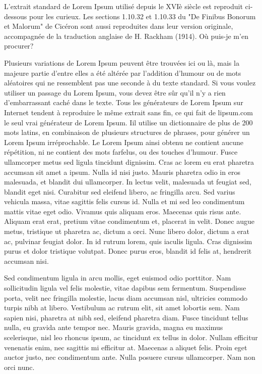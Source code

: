 L'extrait standard de Lorem Ipsum utilisé depuis le XVIè siècle est reproduit ci-dessous pour les curieux. Les sections 1.10.32 et 1.10.33 du "De Finibus Bonorum et Malorum" de Cicéron sont aussi reproduites dans leur version originale, accompagnée de la traduction anglaise de H. Rackham (1914).
Où puis-je m'en procurer?

Plusieurs variations de Lorem Ipsum peuvent être trouvées ici ou là, mais la majeure partie d'entre elles a été altérée par l'addition d'humour ou de mots aléatoires qui ne ressemblent pas une seconde à du texte standard. Si vous voulez utiliser un passage du Lorem Ipsum, vous devez être sûr qu'il n'y a rien d'embarrassant caché dans le texte. Tous les générateurs de Lorem Ipsum sur Internet tendent à reproduire le même extrait sans fin, ce qui fait de lipsum.com le seul vrai générateur de Lorem Ipsum. Iil utilise un dictionnaire de plus de 200 mots latins, en combinaison de plusieurs structures de phrases, pour générer un Lorem Ipsum irréprochable. Le Lorem Ipsum ainsi obtenu ne contient aucune répétition, ni ne contient des mots farfelus, ou des touches d'humour.
 Fusce ullamcorper metus sed ligula tincidunt dignissim. Cras ac lorem eu erat pharetra accumsan sit amet a ipsum. Nulla id nisi justo. Mauris pharetra odio in eros malesuada, et blandit dui ullamcorper. In lectus velit, malesuada ut feugiat sed, blandit eget nisi. Curabitur sed eleifend libero, ac fringilla arcu. Sed varius vehicula massa, vitae sagittis felis cursus id. Nulla et mi sed leo condimentum mattis vitae eget odio. Vivamus quis aliquam eros. Maecenas quis risus ante. Aliquam erat erat, pretium vitae condimentum et, placerat in velit. Donec augue metus, tristique ut pharetra ac, dictum a orci. Nunc libero dolor, dictum a erat ac, pulvinar feugiat dolor. In id rutrum lorem, quis iaculis ligula. Cras dignissim purus et dolor tristique volutpat. Donec purus eros, blandit id felis at, hendrerit accumsan nisi.

Sed condimentum ligula in arcu mollis, eget euismod odio porttitor. Nam sollicitudin ligula vel felis molestie, vitae dapibus sem fermentum. Suspendisse porta, velit nec fringilla molestie, lacus diam accumsan nisl, ultricies commodo turpis nibh at libero. Vestibulum ac rutrum elit, sit amet lobortis sem. Nam sapien nisi, pharetra at nibh sed, eleifend pharetra diam. Fusce tincidunt tellus nulla, eu gravida ante tempor nec. Mauris gravida, magna eu maximus scelerisque, nisl leo rhoncus ipsum, ac tincidunt ex tellus in dolor. Nullam efficitur venenatis enim, nec sagittis mi efficitur at. Maecenas a aliquet felis. Proin eget auctor justo, nec condimentum ante. Nulla posuere cursus ullamcorper. Nam non orci nunc.

